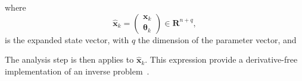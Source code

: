where
\begin{equation*}
    \hat{\bm{x}}_k = \begin{pmatrix}
        \bm{x}_k \\
        \bm{\theta}_k
    \end{pmatrix} \in \mathbf{R}^{n+q},
\end{equation*}
is the expanded state vector, with $q$ the dimension of the parameter vector, and

The analysis step is then applies to $\hat{\bm{x}}_k$. This expression provide a derivative-free implementation of an inverse problem~\cite{iglesias_ensemble_2013}.

